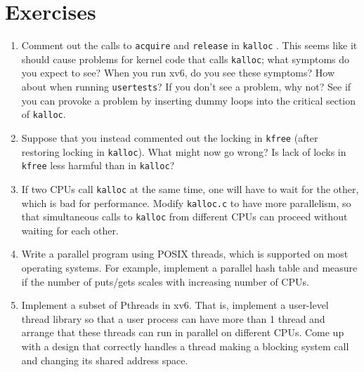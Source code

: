 \section{Exercises}

\begin{enumerate}
  
\item Comment out the calls to
\lstinline{acquire}
and
\lstinline{release}
in
\lstinline{kalloc}
.
This seems like it should cause problems for
kernel code that calls
\lstinline{kalloc};
what symptoms do you expect to see?
When you run xv6, do you see these symptoms?
How about when running
\lstinline{usertests}?
If you don't see a problem, why not?
See if you can provoke a problem by inserting
dummy loops into the critical section of
\lstinline{kalloc}.

\item Suppose that you instead commented out the
locking in
\lstinline{kfree} 
(after restoring locking in
\lstinline{kalloc}).
What might now go wrong? Is lack of locks in
\lstinline{kfree}
less harmful than in
\lstinline{kalloc}?

\item If two CPUs call
\lstinline{kalloc}
at the same time, one will have to wait for the other,
which is bad for performance.
Modify 
\lstinline{kalloc.c}
to have more parallelism, so that simultaneous
calls to
\lstinline{kalloc}
from different CPUs can proceed without waiting for each other.

\item Write a parallel program using POSIX threads, which is supported on most
operating systems. For example, implement a parallel hash table and measure if
the number of puts/gets scales with increasing number of CPUs.

\item Implement a subset of Pthreads in xv6.  That is, implement a user-level
thread library so that a user process can have more than 1 thread and arrange
that these threads can run in parallel on different CPUs.  Come up with a
design that correctly handles a thread making a blocking system call and
changing its shared address space.

\end{enumerate}

